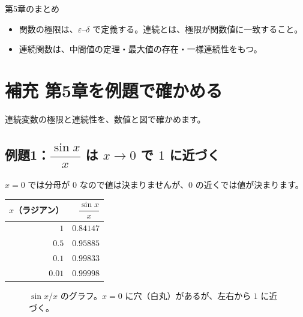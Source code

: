\documentclass[a4paper,11pt,openany]{ltjsbook}
\begin{document}
\begin{pointbox}{第5章のまとめ}
\begin{itemize}[leftmargin=1.5em]
\item 関数の極限は、$\varepsilon$–$\delta$ で定義する。連続とは、極限が関数値に一致すること。
\item 連続関数は、中間値の定理・最大値の存在・一様連続性をもつ。
\end{itemize}
\end{pointbox}

\section{補充 第5章を例題で確かめる}

連続変数の極限と連続性を、数値と図で確かめます。

\subsection*{例題1：$\dfrac{\sin x}{x}$ は $x\to0$ で $1$ に近づく}

$x=0$ では分母が $0$ なので値は決まりませんが、$0$ の近くでは値が決まります。

\begin{center}
\begin{tabular}{rr}
\toprule
$x$（ラジアン） & $\dfrac{\sin x}{x}$\\
\midrule
$1$ & $0.84147$\\
$0.5$ & $0.95885$\\
$0.1$ & $0.99833$\\
$0.01$ & $0.99998$\\
\bottomrule
\end{tabular}
\end{center}

\begin{figure}[htbp]
\centering
{}
\caption{$\sin x/x$ のグラフ。$x=0$ に穴（白丸）があるが、左右から $1$ に近づく。}
\end{figure}
\end{document}
